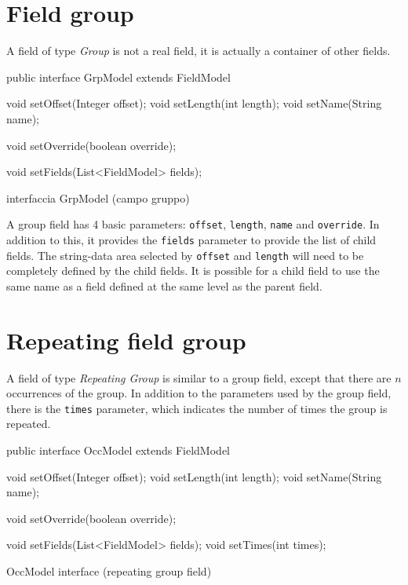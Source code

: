\documentclass[a4paper,10pt]{report}
\newenvironment{elisting}[1][H]
  {\captionsetup{aboveskip=0pt}\begin{listing}[#1]}
  {\end{listing}%
}
\begin{document}
\section{Field group}
A field of type \textsl{Group} is not a real field, it is actually a container 
of other fields.

\begin{elisting}[!htb]
\begin{javacode}
public interface GrpModel extends FieldModel {
    void setOffset(Integer offset);
    void setLength(int length);
    void setName(String name);
    
    void setOverride(boolean override);
    
    void setFields(List<FieldModel> fields);
}
\end{javacode}
\caption{interfaccia GrpModel (campo gruppo)}
\label{lst:GrpModel}
\end{elisting}

A group field has 4 basic parameters: \verb!offset!, \verb!length!, \verb!name! 
and \verb!override!. 
In addition to this, it provides the \verb!fields! parameter to provide the list 
of child fields. 
The string-data area selected by \verb!offset! and \verb!length! will need to be 
completely defined by the child fields. 
It is possible for a child field to use the same name as a field defined at the 
same level as the parent field.

\section{Repeating field group}
A field of type \textsl{Repeating Group} is similar to a group field, except 
that there are $n$ occurrences of the group. 
In addition to the parameters used by the group field, there is the \verb!times! 
parameter, which indicates the number of times the group is repeated.

\begin{elisting}[!htb]
\begin{javacode}
public interface OccModel extends  FieldModel {
    void setOffset(Integer offset);
    void setLength(int length);
    void setName(String name);
    
    void setOverride(boolean override);
    
    void setFields(List<FieldModel> fields);
    void setTimes(int times);
}
\end{javacode}
\caption{OccModel interface (repeating group field)}
\label{lst:OccModel}
\end{elisting}
\end{document}

